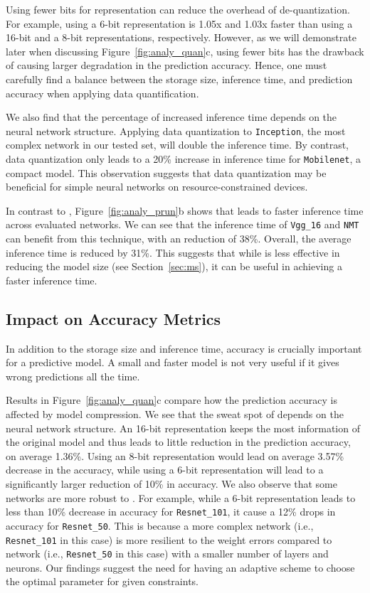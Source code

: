 Using fewer bits for representation can reduce the overhead of de-quantization. For example, using a 6-bit representation is 1.05x and
1.03x faster than using a 16-bit and a 8-bit representations, respectively. However, as we will demonstrate later when discussing
Figure~\ref{fig:analy_quan}c, using fewer bits has the drawback of causing larger degradation in the prediction accuracy. Hence, one must
carefully find a balance between the storage size, inference time, and prediction accuracy when applying data quantification.

We also find that the percentage of increased inference time depends on the neural network structure. Applying data quantization to
\texttt{Inception}, the most complex network in our \CNN tested set, will double the inference time. By contrast, data quantization only
leads to a 20\% increase in inference time for \texttt{Mobilenet}, a compact model. This observation suggests that data quantization may be
beneficial for simple neural networks on resource-constrained devices.


In contrast to \quantization, Figure~\ref{fig:analy_prun}b shows that \pruning leads to faster inference time across evaluated networks. We
can see that the inference time of \texttt{Vgg\_16} and \texttt{NMT} can benefit from this technique, with an reduction of 38\%.  Overall,
the average inference time is reduced by 31\%. This suggests that while \pruning is less effective in reducing the model size (see
Section~\ref{sec:ms}), it can be useful in achieving a faster inference time.


\subsection{Impact on Accuracy Metrics}
In addition to the storage size and inference time, accuracy is crucially important for a predictive model. A small and faster model is not
very useful if it gives wrong predictions all the time.


Results in Figure~\ref{fig:analy_quan}c compare how the prediction accuracy is affected by model compression. We see that the sweat spot of
\quantization depends on the neural network structure. An 16-bit representation keeps the most information of the original model and thus
leads to little reduction in the prediction accuracy, on average  1.36\%.  Using an 8-bit representation would lead on average 3.57\%
decrease in the accuracy, while using a 6-bit representation will lead to a significantly larger reduction of 10\% in  accuracy. We also
observe that some networks are more robust to \quantization. For example, while a 6-bit representation leads to less than 10\% decrease in
accuracy for \texttt{Resnet\_101}, it cause a 12\% drops in accuracy for \texttt{Resnet\_50}. This is because a more complex network (i.e.,
\texttt{Resnet\_101} in this case) is more resilient to the weight errors compared to network (i.e., \texttt{Resnet\_50} in this case) with
a smaller number of layers and neurons. Our findings suggest the need for having an adaptive scheme to choose the optimal \dquantization
parameter for given constraints.


